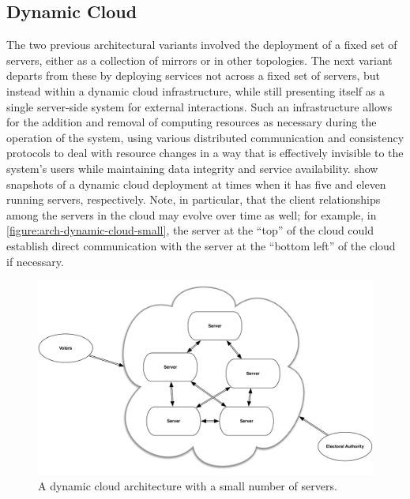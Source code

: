 \subsection{Dynamic Cloud}

The two previous architectural variants involved the deployment of a
fixed set of servers, either as a collection of mirrors or in other
topologies. The next variant departs from these by deploying services
not across a fixed set of servers, but instead within a dynamic cloud
infrastructure, while still presenting itself as a single server-side
system for external interactions. Such an infrastructure allows for
the addition and removal of computing resources as necessary during
the operation of the system, using various distributed communication
and consistency protocols to deal with resource changes in a way that
is effectively invisible to the system's users while maintaining data
integrity and service
availability.  show snapshots of a dynamic cloud
deployment at times when it has five and eleven running servers,
respectively. Note, in particular, that the client relationships among
the servers in the cloud may evolve over time as well; for example, in
\autoref{figure:arch-dynamic-cloud-small}, the server at the ``top''
of the cloud could establish direct communication with the server at
the ``bottom left'' of the cloud if necessary.

\begin{figure}[p]
\begin{center}
\includegraphics[width=5.5in]{architecture_resources/dynamic-cloud-small.pdf}
\end{center}
\caption{A dynamic cloud architecture with a small number of servers.}
\label{figure:arch-dynamic-cloud-small}
\end{figure}


